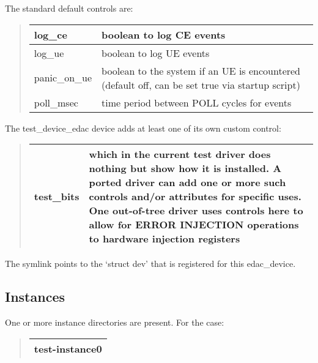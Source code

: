 \documentclass[a4paper,8pt,english]{sphinxmanual}
\begin{document}
The standard default controls are:
\begin{quote}

\begin{tabulary}{\linewidth}{|L|L|}
\hline

log\_ce
 & 
boolean to log CE events
\\
\hline
log\_ue
 & 
boolean to log UE events
\\
\hline
panic\_on\_ue
 & 
boolean to  the system if an UE is encountered
(default off, can be set true via startup script)
\\
\hline
poll\_msec
 & 
time period between POLL cycles for events
\\
\hline\end{tabulary}

\end{quote}

The test\_device\_edac device adds at least one of its own custom control:
\begin{quote}

\begin{tabulary}{\linewidth}{|L|L|}
\hline

test\_bits
 & 
which in the current test driver does nothing but
show how it is installed. A ported driver can
add one or more such controls and/or attributes
for specific uses.
One out-of-tree driver uses controls here to allow
for ERROR INJECTION operations to hardware
injection registers
\\
\hline\end{tabulary}

\end{quote}

The symlink points to the `struct dev' that is registered for this edac\_device.


\subsection{Instances}
\label{admin-guide/ras:instances}
One or more instance directories are present. For the 
case:
\begin{quote}

\begin{tabulary}{\linewidth}{|L|}
\hline

test-instance0
\\
\hline\end{tabulary}

\end{quote}
\end{document}
